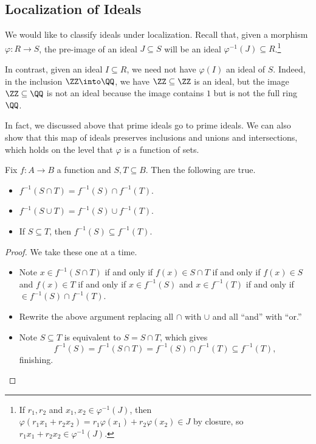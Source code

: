 \subsection{Localization of Ideals}
We would like to classify ideals under localization. Recall that, given a morphism $\varphi:R\to S$, the pre-image of an ideal $J\subseteq S$ will be an ideal $\varphi^{-1}(J)\subseteq R$.\footnote{If $r_1,r_2$ and $x_1,x_2\in\varphi^{-1}(J)$, then $\varphi(r_1x_1+r_2x_2)=r_1\varphi(x_1)+r_2\varphi(x_2)\in J$ by closure, so $r_1x_1+r_2x_2\in\varphi^{-1}(J)$.}
\begin{remark}
	In contrast, given an ideal $I\subseteq R$, we need not have $\varphi(I)$ an ideal of $S$. Indeed, in the inclusion $\ZZ\into\QQ$, we have $\ZZ\subseteq\ZZ$ is an ideal, but the image $\ZZ\subseteq\QQ$ is not an ideal because the image contains $1$ but is not the full ring $\QQ$.
\end{remark}
In fact, we discussed above that prime ideals go to prime ideals. We can also show that this map of ideals preserves inclusions and unions and intersections, which holds on the level that $\varphi$ is a function of sets.
\begin{lemma}
	Fix $f:A\to B$ a function and $S,T\subseteq B$. Then the following are true.
	\begin{itemize}
		\item $f^{-1}(S\cap T)=f^{-1}(S)\cap f^{-1}(T)$.
		\item $f^{-1}(S\cup T)=f^{-1}(S)\cup f^{-1}(T)$.
		\item If $S\subseteq T$, then $f^{-1}(S)\subseteq f^{-1}(T)$.
	\end{itemize}
\end{lemma}
\begin{proof}
	We take these one at a time.
	\begin{itemize}
		\item Note $x\in f^{-1}(S\cap T)$ if and only if $f(x)\in S\cap T$ if and only if $f(x)\in S$ and $f(x)\in T$ if and only if $x\in f^{-1}(S)$ and $x\in f^{-1}(T)$ if and only if $\in f^{-1}(S)\cap f^{-1}(T)$.
		\item Rewrite the above argument replacing all $\cap$ with $\cup$ and all ``and'' with ``or.''
		\item Note $S\subseteq T$ is equivalent to $S=S\cap T$, which gives
		\[f^{-1}(S)=f^{-1}(S\cap T)=f^{-1}(S)\cap f^{-1}(T)\subseteq f^{-1}(T),\]
		finishing.
		\qedhere
	\end{itemize}
\end{proof}

